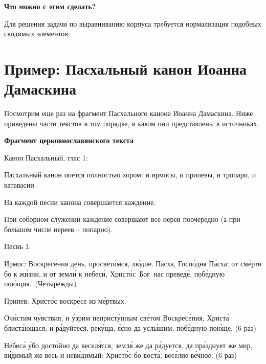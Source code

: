\documentclass[
  letterpaper,
]{book}
\begin{document}
\begin{tcolorbox}[enhanced jigsaw, breakable, arc=.35mm, colframe=quarto-callout-note-color-frame, leftrule=.75mm, bottomrule=.15mm, rightrule=.15mm, toprule=.15mm, opacityback=0, left=2mm, colback=white]

\textbf{Что можно с этим сделать?}\vspace{2mm}

Для решения задачи по выравниванию корпуса требуется нормализация
подобных сводимых элементов.

\end{tcolorbox}


\hypertarget{ux43fux440ux438ux43cux435ux440-ux43fux430ux441ux445ux430ux43bux44cux43dux44bux439-ux43aux430ux43dux43eux43d-ux438ux43eux430ux43dux43dux430-ux434ux430ux43cux430ux441ux43aux438ux43dux430}{%
\chapter{Пример: Пасхальный канон Иоанна
Дамаскина}\label{ux43fux440ux438ux43cux435ux440-ux43fux430ux441ux445ux430ux43bux44cux43dux44bux439-ux43aux430ux43dux43eux43d-ux438ux43eux430ux43dux43dux430-ux434ux430ux43cux430ux441ux43aux438ux43dux430}}

Посмотрим еще раз на фрагмент Пасхального канона Иоанна Дамаскина. Ниже
приведены части текстов в том порядке, в каком они представлены в
источниках.

\begin{tcolorbox}[enhanced jigsaw, breakable, arc=.35mm, colframe=quarto-callout-tip-color-frame, leftrule=.75mm, bottomrule=.15mm, rightrule=.15mm, toprule=.15mm, opacityback=0, left=2mm, colback=white]

\textbf{Фрагмент церковнославянского текста}\vspace{2mm}

Канон Пасхальный, глас 1:

Пасхальный канон поется полностью хором: и ирмосы, и припевы, и тропари,
и катавасии.

На каждой песни канона совершается каждение.

При соборном служении каждение совершают все иереи поочередно (а при
большом числе иереев -- попарно).

Песнь 1:

Ирмос: Воскресе́ния день, просвети́мся, лю́дие. Па́сха, Госпо́дня Па́сха: от
сме́рти бо к жи́зни, и от земли́ к небеси́, Христо́с~Бог~нас преведе́,
побе́дную пою́щия.~(Четырежды)

Припев: Христо́с воскре́се из ме́ртвых.

Очи́стим чу́вствия, и у́зрим непристу́пным све́том Воскресе́ния, Христа́
блиста́ющася, и ра́дуйтеся, реку́ща, я́сно да услы́шим, побе́дную пою́ще. (6
раз)

Небеса́ у́бо досто́йно да веселя́тся, земля́ же да ра́дуется, да пра́зднует же
мир, ви́димый же весь и неви́димый: Христо́с бо воста́, весе́лие ве́чное. (6
раз)

\end{tcolorbox}
\end{document}
